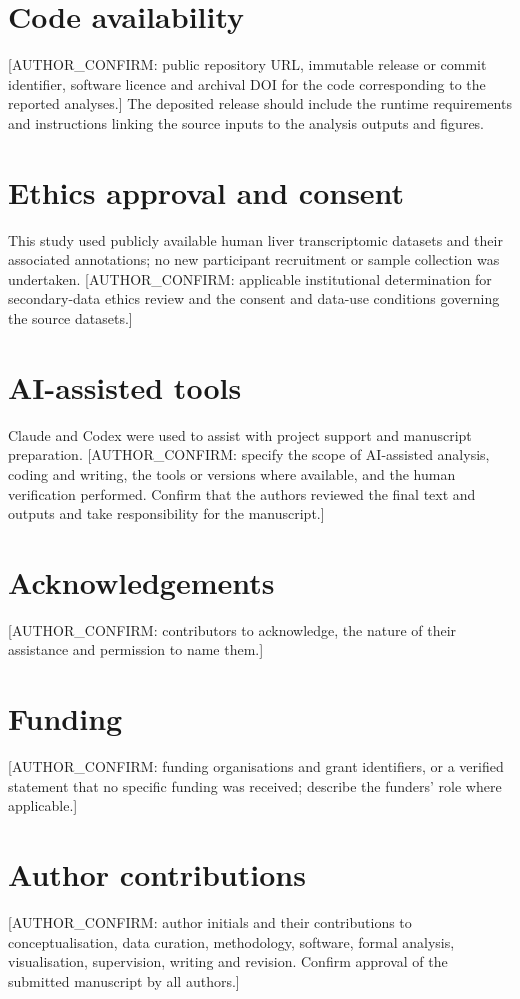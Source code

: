 \documentclass[11pt,a4paper]{article}
\begin{document}
\section*{Code availability}
[AUTHOR\_CONFIRM: public repository URL, immutable release or commit identifier, software licence and archival DOI for the code corresponding to the reported analyses.] The deposited release should include the runtime requirements and instructions linking the source inputs to the analysis outputs and figures.

\section*{Ethics approval and consent}
This study used publicly available human liver transcriptomic datasets and their associated annotations; no new participant recruitment or sample collection was undertaken. [AUTHOR\_CONFIRM: applicable institutional determination for secondary-data ethics review and the consent and data-use conditions governing the source datasets.]

\section*{AI-assisted tools}
Claude and Codex were used to assist with project support and manuscript preparation. [AUTHOR\_CONFIRM: specify the scope of AI-assisted analysis, coding and writing, the tools or versions where available, and the human verification performed. Confirm that the authors reviewed the final text and outputs and take responsibility for the manuscript.]

\section*{Acknowledgements}
[AUTHOR\_CONFIRM: contributors to acknowledge, the nature of their assistance and permission to name them.]

\section*{Funding}
[AUTHOR\_CONFIRM: funding organisations and grant identifiers, or a verified statement that no specific funding was received; describe the funders' role where applicable.]

\section*{Author contributions}
[AUTHOR\_CONFIRM: author initials and their contributions to conceptualisation, data curation, methodology, software, formal analysis, visualisation, supervision, writing and revision. Confirm approval of the submitted manuscript by all authors.]
\end{document}
